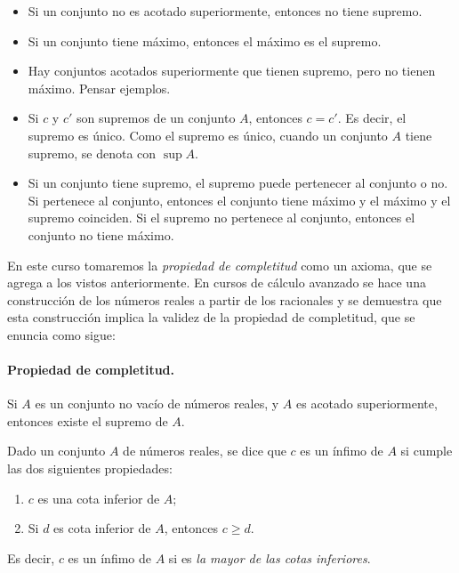 \begin{itemize}
    \item Si un conjunto no es acotado superiormente, entonces no tiene supremo.
    \item Si un conjunto tiene máximo, entonces el máximo es el supremo.
    \item Hay conjuntos acotados superiormente que tienen supremo, pero no tienen máximo. Pensar ejemplos.
    \item Si $c$ y $c'$ son supremos de un conjunto $A$, entonces $c=c'$. Es decir, el supremo es único.
    Como el supremo es único, cuando un conjunto $A$ tiene supremo, se denota con $\sup A$.
    \item Si un conjunto tiene supremo, el supremo puede pertenecer al conjunto o no. Si pertenece al conjunto, entonces el conjunto tiene máximo y el máximo y el supremo coinciden. Si el supremo no pertenece al conjunto, entonces el conjunto no tiene máximo.
\end{itemize}



En este curso tomaremos la \emph{propiedad de completitud} como un axioma, que se agrega a los vistos anteriormente. En cursos de cálculo avanzado se hace una construcción de los números reales a partir de los racionales y se demuestra que esta construcción implica la validez de la propiedad de completitud, que se enuncia como sigue:

\paragraph{Propiedad de completitud.} Si $A$ es un conjunto no vacío de números reales, y $A$ es acotado superiormente, entonces existe el supremo de $A$.


\begin{definition}
    Dado un conjunto $A$ de números reales, se dice que $c$ es un ínfimo de $A$ si cumple las dos siguientes propiedades:
    \begin{enumerate}[{\rm(i)}] 
        \item $c$ es una cota inferior de $A$;
        \item Si $d$ es cota inferior de $A$, entonces $c \ge d$.
    \end{enumerate}
    Es decir, $c$ es un ínfimo de $A$ si es \emph{la mayor de las cotas inferiores}.

\end{definition}


